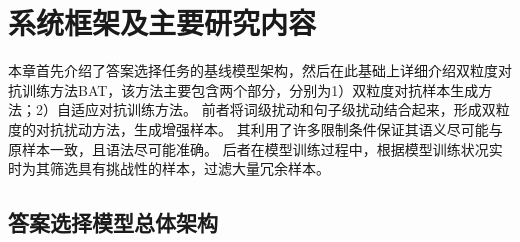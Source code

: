 


\section{系统框架及主要研究内容}


本章首先介绍了答案选择任务的基线模型架构，然后在此基础上详细介绍双粒度对抗训练方法BAT，该方法主要包含两个部分，分别为1）双粒度对抗样本生成方法；2）自适应对抗训练方法。
前者将词级扰动和句子级扰动结合起来，形成双粒度的对抗扰动方法，生成增强样本。
其利用了许多限制条件保证其语义尽可能与原样本一致，且语法尽可能准确。
后者在模型训练过程中，根据模型训练状况实时为其筛选具有挑战性的样本，过滤大量冗余样本。

\subsection{答案选择模型总体架构}

